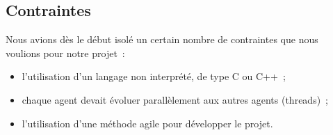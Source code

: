         \subsection{Contraintes}
        Nous avions dès le début isolé un certain nombre de contraintes que nous voulions pour notre projet~:
        \begin{itemize}
          \item l'utilisation d'un langage non interprété, de type C ou C++~;
		  \item chaque agent devait évoluer parallèlement aux autres agents (threads)~;
          \item l'utilisation d'une méthode agile pour développer le projet.
        \end{itemize}
